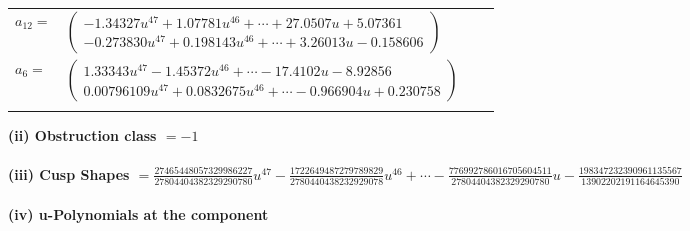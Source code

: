\documentclass[1p]{elsarticle_modified}
\theoremstyle{definition}
\begin{document}
\begin{tabular}{m{7pt} m{180pt} m{7pt} m{180pt} }
\flushright $a_{12}=$&$\begin{pmatrix}-1.34327 u^{47}+1.07781 u^{46}+\cdots+27.0507 u+5.07361\\-0.273830 u^{47}+0.198143 u^{46}+\cdots+3.26013 u-0.158606\end{pmatrix}$ \\
\flushright $a_{6}=$&$\begin{pmatrix}1.33343 u^{47}-1.45372 u^{46}+\cdots-17.4102 u-8.92856\\0.00796109 u^{47}+0.0832675 u^{46}+\cdots-0.966904 u+0.230758\end{pmatrix}$\\&\end{tabular}
\flushleft \textbf{(ii) Obstruction class $= -1$}\\~\\
\flushleft \textbf{(iii) Cusp Shapes $= \frac{27465448057329986227}{27804404382329290780} u^{47}-\frac{1722649487279789829}{2780440438232929078} u^{46}+\cdots-\frac{776992786016705604511}{27804404382329290780} u-\frac{198347232390961135567}{13902202191164645390}$}\\~\\
\newpage\renewcommand{\arraystretch}{1}
\flushleft \textbf{(iv) u-Polynomials at the component}\newline \\
\end{document}
